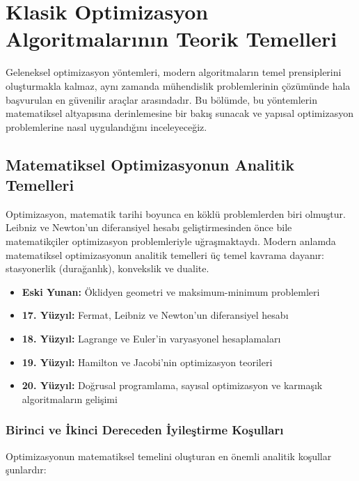 \section{Klasik Optimizasyon Algoritmalarının Teorik Temelleri}

Geleneksel optimizasyon yöntemleri, modern algoritmaların temel prensiplerini oluşturmakla kalmaz, aynı zamanda mühendislik problemlerinin çözümünde hala başvurulan en güvenilir araçlar arasındadır. Bu bölümde, bu yöntemlerin matematiksel altyapısına derinlemesine bir bakış sunacak ve yapısal optimizasyon problemlerine nasıl uygulandığını inceleyeceğiz.

\subsection{Matematiksel Optimizasyonun Analitik Temelleri}

Optimizasyon, matematik tarihi boyunca en köklü problemlerden biri olmuştur. Leibniz ve Newton'un diferansiyel hesabı geliştirmesinden önce bile matematikçiler optimizasyon problemleriyle uğraşmaktaydı. Modern anlamda matematiksel optimizasyonun analitik temelleri üç temel kavrama dayanır: stasyonerlik (durağanlık), konvekslik ve dualite.

\begin{tcolorbox}[title=Tarihsel Perspektif]
\begin{itemize}
    \item \textbf{Eski Yunan:} Öklidyen geometri ve maksimum-minimum problemleri
    \item \textbf{17. Yüzyıl:} Fermat, Leibniz ve Newton'un diferansiyel hesabı
    \item \textbf{18. Yüzyıl:} Lagrange ve Euler'in varyasyonel hesaplamaları
    \item \textbf{19. Yüzyıl:} Hamilton ve Jacobi'nin optimizasyon teorileri
    \item \textbf{20. Yüzyıl:} Doğrusal programlama, sayısal optimizasyon ve karmaşık algoritmaların gelişimi
\end{itemize}
\end{tcolorbox}

\subsubsection{Birinci ve İkinci Dereceden İyileştirme Koşulları}

Optimizasyonun matematiksel temelini oluşturan en önemli analitik koşullar şunlardır:

